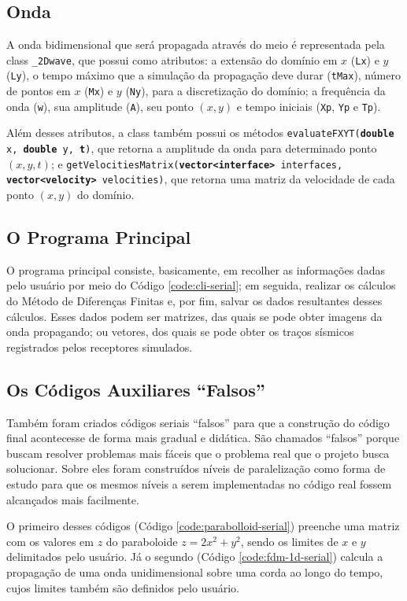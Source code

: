 \subsection{Onda}
A onda bidimensional que será propagada através do meio é representada pela \gls{class} \texttt{\_2Dwave}, que possui como
atributos: a extensão do domínio em $x$ (\texttt{Lx}) e $y$ (\texttt{Ly}), o tempo máximo que a simulação
da propagação deve durar (\texttt{tMax}), número de pontos em $x$ (\texttt{Mx}) e $y$ (\texttt{Ny}), para
a discretização do domínio; a frequência da onda (\texttt{w}), sua amplitude (\texttt{A}), seu ponto $(x, y)$ e tempo iniciais
(\texttt{Xp}, \texttt{Yp} e \texttt{Tp}).

Além desses atributos, a \gls{class} também possui os métodos
\texttt{evaluateFXYT(\textbf{double} x, \textbf{double} y, \textbf{t})}, que retorna a amplitude da onda para determinado ponto
$(x, y, t)$; e \newline\texttt{getVelocitiesMatrix(\textbf{vector<interface>} interfaces, \textbf{vector<velocity>} velocities)},
que retorna uma matriz da velocidade de cada ponto $(x, y)$ do domínio.

\subsection{O Programa Principal}
O programa principal consiste, basicamente, em recolher as informações dadas pelo usuário por meio do Código
\ref{code:cli-serial}; em seguida, realizar os cálculos do Método de Diferenças Finitas e, por fim, salvar
os dados resultantes desses cálculos. Esses dados podem ser matrizes, das quais se pode obter imagens da onda propagando; ou vetores, dos
quais se pode obter os traços sísmicos registrados pelos receptores simulados.

\subsection{Os Códigos Auxiliares ``Falsos''}
Também foram criados códigos seriais ``falsos'' para que a construção do código final acontecesse de forma mais gradual e didática.
São chamados ``falsos'' porque buscam resolver problemas mais fáceis que o problema real que o projeto busca solucionar. Sobre
eles foram construídos níveis de paralelização como forma de estudo para que os mesmos níveis a serem implementadas no código real
fossem alcançados mais facilmente.

O primeiro desses códigos (Código \ref{code:parabolloid-serial}) preenche uma matriz com os valores em $z$ do paraboloide $z = 2x^2 + y^2$,
sendo os limites de $x$ e $y$ delimitados pelo usuário. Já o segundo (Código \ref{code:fdm-1d-serial}) calcula a propagação de uma onda
unidimensional sobre uma corda ao longo do tempo, cujos limites também são definidos pelo usuário.

